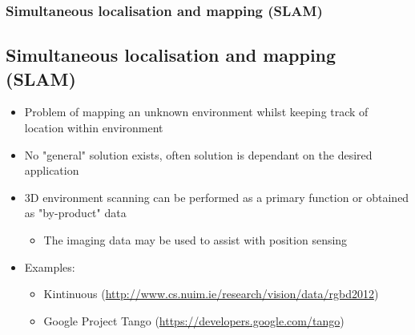 \documentclass[10pt,serif,t]{beamer}
\newenvironment{SubSlide}[1]
{
  \begin{frame}[fragile,environment=SubSlide]
    \frametitle{#1}
    \subsection{#1}
  }
  {
  \end{frame}
}
\begin{document}
\begin{SubSlide}{Simultaneous localisation and mapping (SLAM)}
  \begin{itemize}
    \item
      Problem of mapping an unknown environment whilst keeping track of location
      within environment

      \vspace{1em}

      \pause

    \item
      No "general" solution exists, often solution is dependant on the desired
      application

    \item
      3D environment scanning can be performed as a primary function or obtained
      as "by-product" data

      \begin{itemize}
        \item
          The imaging data may be used to assist with position sensing

      \end{itemize}

      \vspace{1em}

      \pause

    \item
      Examples:

      \begin{itemize}
        \item
          Kintinuous (\url{http://www.cs.nuim.ie/research/vision/data/rgbd2012})

        \item
          Google Project Tango (\url{https://developers.google.com/tango})

      \end{itemize}

  \end{itemize}
\end{SubSlide}
\end{document}
